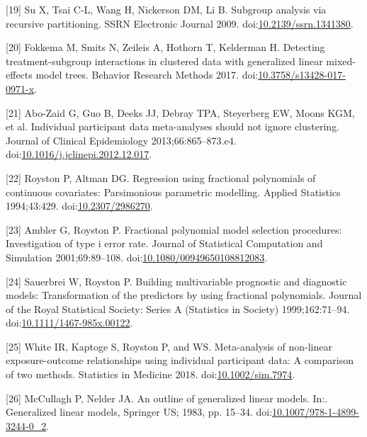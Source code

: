 \documentclass[14pt,]{article}
\begin{document}
\leavevmode\hypertarget{ref-Su_2009}{}%
{[}19{]} Su X, Tsai C-L, Wang H, Nickerson DM, Li B. Subgroup analysis
via recursive partitioning. SSRN Electronic Journal 2009.
doi:\href{https://doi.org/10.2139/ssrn.1341380}{10.2139/ssrn.1341380}.

\leavevmode\hypertarget{ref-Fokkema_2017}{}%
{[}20{]} Fokkema M, Smits N, Zeileis A, Hothorn T, Kelderman H.
Detecting treatment-subgroup interactions in clustered data with
generalized linear mixed-effects model trees. Behavior Research Methods
2017.
doi:\href{https://doi.org/10.3758/s13428-017-0971-x}{10.3758/s13428-017-0971-x}.

\leavevmode\hypertarget{ref-Abo_Zaid_2013}{}%
{[}21{]} Abo-Zaid G, Guo B, Deeks JJ, Debray TPA, Steyerberg EW, Moons
KGM, et al. Individual participant data meta-analyses should not ignore
clustering. Journal of Clinical Epidemiology 2013;66:865--873.e4.
doi:\href{https://doi.org/10.1016/j.jclinepi.2012.12.017}{10.1016/j.jclinepi.2012.12.017}.

\leavevmode\hypertarget{ref-Royston_1994}{}%
{[}22{]} Royston P, Altman DG. Regression using fractional polynomials
of continuous covariates: Parsimonious parametric modelling. Applied
Statistics 1994;43:429.
doi:\href{https://doi.org/10.2307/2986270}{10.2307/2986270}.

\leavevmode\hypertarget{ref-Ambler_2001}{}%
{[}23{]} Ambler G, Royston P. Fractional polynomial model selection
procedures: Investigation of type i error rate. Journal of Statistical
Computation and Simulation 2001;69:89--108.
doi:\href{https://doi.org/10.1080/00949650108812083}{10.1080/00949650108812083}.

\leavevmode\hypertarget{ref-Sauerbrei_1999}{}%
{[}24{]} Sauerbrei W, Royston P. Building multivariable prognostic and
diagnostic models: Transformation of the predictors by using fractional
polynomials. Journal of the Royal Statistical Society: Series A
(Statistics in Society) 1999;162:71--94.
doi:\href{https://doi.org/10.1111/1467-985x.00122}{10.1111/1467-985x.00122}.

\leavevmode\hypertarget{ref-White_2018}{}%
{[}25{]} White IR, Kaptoge S, Royston P, and WS. Meta-analysis of
non-linear exposure-outcome relationships using individual participant
data: A comparison of two methods. Statistics in Medicine 2018.
doi:\href{https://doi.org/10.1002/sim.7974}{10.1002/sim.7974}.

\leavevmode\hypertarget{ref-McCullagh_1983}{}%
{[}26{]} McCullagh P, Nelder JA. An outline of generalized linear
models. In:. Generalized linear models, Springer US; 1983, pp. 15--34.
doi:\href{https://doi.org/10.1007/978-1-4899-3244-0_2}{10.1007/978-1-4899-3244-0\_2}.
\end{document}
